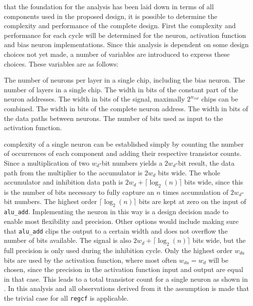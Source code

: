  that the foundation for the analysis has been laid down in terms of all components used in the proposed design, it is possible to determine the complexity and performance of the complete design. First the complexity and performance for each cycle will be determined for the neuron, activation function and bias neuron implementations. Since this analysis is dependent on some design choices not yet made, a number of variables are introduced to express these choices. These variables are as follows:
\begin{itemize}
   The number of neurons per layer in a single chip, including the bias neuron.
   The number of layers in a single chip.
   The width in bits of the constant part of the neuron addresses.
   The width in bits of the  signal, maximally $2^{w_{cid}}$ chips can be combined.
   The width in bits of the complete neuron address.
   The width in bits of the data paths between neurons.
   The number of bits used as input to the activation function.
\end{itemize}

 complexity of a single neuron can be established simply by counting the number of occurrences of each component and adding their respective transistor counts. Since a multiplication of two $w_{d}$-bit numbers yields a $2w_{d}$-bit result, the data path from the multiplier to the accumulator is $2w_{d}$ bits wide. The whole accumulator and inhibition data path is $2w_{d} + \lceil\log_{2}(n)\rceil$ bits wide, since this is the number of bits necessary to fully capture an $n$ times accumulation of $2w_{d}$-bit numbers. The highest order $\lceil\log_{2}(n)\rceil$ bits are kept at zero on the  input of \texttt{alu\_add}. Implementing the neuron in this way is a design decision made to enable most flexibility and precision. Other options would include making sure that \texttt{alu\_add} clips the output to a certain width and does not overflow the number of bits available. The  signal is also $2w_{d} + \lceil\log_{2}(n)\rceil$ bits wide, but the full precision is only used during the inhibition cycle. Only the highest order $w_{da}$ bits are used by the activation function, where most often $w_{da} = w_{d}$ will be chosen, since the precision in the activation function input and output are equal in that case. This leads to a total transistor count for a single neuron as shown in . In this analysis and all observations derived from it the assumption is made that the trivial case for all \texttt{regcf} is applicable.

